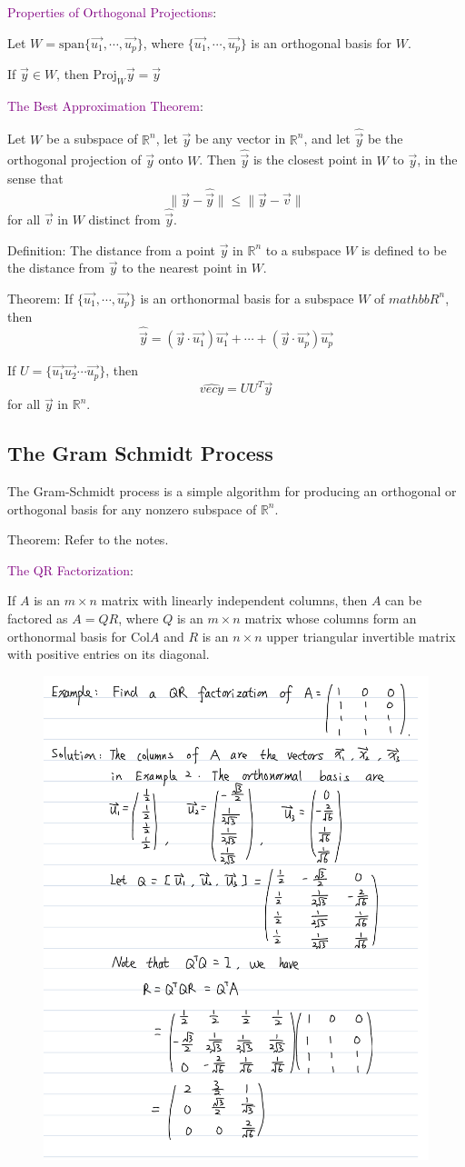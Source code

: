 \documentclass[12pt]{article}
\newcommand\norm[1]{\lVert#1\rVert}
\begin{document}
\textcolor{purple}{Properties of Orthogonal Projections}:

Let $W = \text{span}\{\vec{u_1}, \cdots, \vec{u_p}\}$, where $\{\vec{u_1}, \cdots, \vec{u_p}\}$ is an orthogonal basis for $W$.

If $\vec{y} \in W$, then $\text{Proj}_W \vec{y} = \vec{y}$


\textcolor{purple}{The Best Approximation Theorem}:

Let $W$ be a subspace of $\mathbb{R}^n$, let $\vec{y}$ be any vector in $\mathbb{R}^n$, and let $\hat{\vec{y}}$ be the orthogonal projection of $\vec{y}$ onto $W$. Then $\hat{\vec{y}}$ is the closest point in $W$ to $\vec{y}$, in the sense that $$\norm{\vec{y} - \hat{\vec{y}}} \leq \norm{\vec{y} - \vec{v}}$$ for all $\vec{v}$ in $W$ distinct from $\hat{\vec{y}}$.


Definition: The distance from a point $\vec{y}$ in $\mathbb{R}^n$ to a subspace $W$ is defined to be the distance from $\vec{y}$ to the nearest point in $W$.

Theorem: If $\{\vec{u_1}, \cdots, \vec{u_p}\}$ is an orthonormal basis for a subspace $W$ of $mathbb{R}^n$, then $$\hat{\vec{y}} = (\vec{y}\cdot\vec{u_1})\vec{u_1} + \cdots + (\vec{y}\cdot\vec{u_p})\vec{u_p}$$

If $U = \{\vec{u_1}  \vec{u_2} \cdots \vec{u_p}\}$, then $$\hat{vec{y}} = UU^T\vec{y}$$ for all $\vec{y}$ in $\mathbb{R}^n$.


\subsection{The Gram Schmidt Process}
The Gram-Schmidt process is a simple algorithm for producing an orthogonal or orthogonal basis for any nonzero subspace of $\mathbb{R}^n$.

Theorem: Refer to the notes.


\textcolor{purple}{The QR Factorization}:

If $A$ is an $m\times n$ matrix with linearly independent columns, then $A$ can be factored as $A=QR$, where $Q$ is an $m\times n$ matrix whose columns form an orthonormal basis for Col$A$ and $R$ is an $n\times n$ upper triangular invertible matrix with positive entries on its diagonal.

\begin{figure}[H]
    \centering
    \includegraphics[width = .5\linewidth]{Revision3}
\end{figure}
\end{document}
